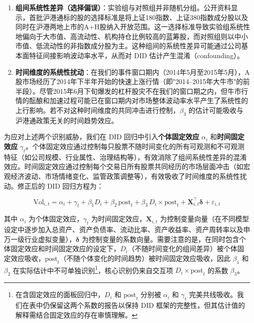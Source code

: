 \documentclass{article}
\begin{document}
\begin{enumerate}
    \item \textbf{组间系统性差异（选择偏误）}：实验组与对照组并非随机分组。公开资料显示，首批沪港通标的股的选择标准是将上证180指数、上证380指数成分股以及同时在沪港两地上市的A+H股纳入开放范围。这一选择标准导致实验组系统性地偏向于大市值、高流动性、机构持仓比例较高的蓝筹股，而对照组则以中小市值、低流动性的非指数成分股为主。这种组间的系统性差异可能通过公司基本面特征间接影响波动率水平，从而对 DID 估计产生混淆（confounding）。

    \item \textbf{时间维度的系统性扰动}：在我们的事件窗口期内（2014年5月至2015年5月），A股市场经历了2014年下半年开始的快速上涨行情（即"2014--2015年大牛市"的前半段）。尽管2015年6月下旬爆发的杠杆股灾不在我们的窗口期之内，但牛市行情的酝酿和加速过程可能已在窗口期内对市场整体波动率水平产生了系统性的上行影响。若不对这种时间维度的共同冲击进行控制，$\beta_3$ 的估计可能吸收与沪港通政策无关的时间趋势效应。
\end{enumerate}

为应对上述两个识别威胁，我们在 DID 回归中引入\textbf{个体固定效应} $\alpha_i$ 和\textbf{时间固定效应} $\gamma_t$。个体固定效应通过控制每只股票不随时间变化的所有可观测和不可观测特征（如公司规模、行业属性、治理结构等），有效消除了组间系统性差异的混淆效应。时间固定效应通过控制每个交易日所有股票共同经历的市场层面冲击（如宏观经济波动、市场情绪变化、监管政策调整等），有效吸收了时间维度的系统性扰动。修正后的 DID 回归方程为：

\begin{equation}
    \text{Vol}_{i,t} = \alpha_i + \gamma_t + \beta_1 D_i + \beta_2 \,\text{post}_t + \beta_3 \,D_i \times \text{post}_t + \mathbf{X}_{i,t}^{\top}\boldsymbol{\delta} + \varepsilon_{i,t}
    \label{eq:did_fe}
\end{equation}

\noindent 其中 $\alpha_i$ 为个体固定效应，$\gamma_t$ 为时间固定效应，$\mathbf{X}_{i,t}$ 为控制变量向量（在不同模型设定中逐步加入总资产、资产负债率、流动比率、资产收益率、资产周转率以及申万一级行业虚拟变量），$\boldsymbol{\delta}$ 为控制变量的系数向量。需要注意的是，在同时包含个体固定效应和时间固定效应的设定下，$D_i$（不随时间变化的组间差异）被个体固定效应吸收，$\text{post}_t$（不随个体变化的时间趋势）被时间固定效应吸收，因此 $\beta_1$ 和 $\beta_2$ 在实际估计中不可单独识别\footnote{在含固定效应的面板回归中，$D_i$ 和 $\text{post}_t$ 分别被 $\alpha_i$ 和 $\gamma_t$ 完美共线吸收。我们在表中仍保留这两个系数的报告以保持 DID 框架的完整性，但其估计值的解释需结合固定效应的存在审慎理解。}，核心识别仍来自交互项 $D_i \times \text{post}_t$ 的系数 $\beta_3$。
\end{document}
